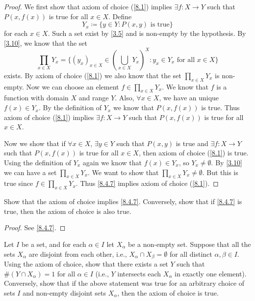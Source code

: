 \begin{proof}
  We first show that axiom of choice (\cref{8.1}) implies \(\exists f : X \to Y\) such that \(P(x, f(x))\) is true for all \(x \in X\).
  Define
  \[
    Y_x \coloneqq \{y \in Y : P(x, y) \text{ is true}\}
  \]
  for each \(x \in X\).
  Such a set exist by \cref{3.5} and is non-empty by the hypothesis.
  By \cref{3.10}, we know that the set
  \[
    \prod_{x \in X} Y_x = \Bigg\{(y_x)_{x \in X} \in (\bigcup_{x \in X} Y_x)^X : y_x \in Y_x \text{ for all } x \in X\Bigg\}
  \]
  exists.
  By axiom of choice (\cref{8.1}) we also know that the set \(\prod_{x \in X} Y_x\) is non-empty.
  Now we can choose an element \(f \in \prod_{x \in X} Y_x\).
  We know that \(f\) is a function with domain \(X\) and range \(Y\).
  Also, \(\forall x \in X\), we have an unique \(f(x) \in Y_x\).
  By the definition of \(Y_x\) we know that \(P(x, f(x))\) is true.
  Thus axiom of choice (\cref{8.1}) implies \(\exists f : X \to Y\) such that \(P(x, f(x))\) is true for all \(x \in X\).

  Now we show that if \(\forall x \in X\), \(\exists y \in Y\) such that \(P(x, y)\) is true and \(\exists f : X \to Y\) such that \(P(x, f(x))\) is true for all \(x \in X\), then axiom of choice (\cref{8.1}) is true.
  Using the definition of \(Y_x\) again we know that \(f(x) \in Y_x\), so \(Y_x \neq \emptyset\).
  By \cref{3.10} we can have a set \(\prod_{x \in X} Y_x\).
  We want to show that \(\prod_{x \in X} Y_x \neq \emptyset\).
  But this is true since \(f \in \prod_{x \in X} Y_x\).
  Thus \cref{8.4.7} implies axiom of choice (\cref{8.1}).
\end{proof}

\exercisesection

\begin{ex}\label{ex:8.4.1}
  Show that the axiom of choice implies \cref{8.4.7}.
  Conversely, show that if \cref{8.4.7} is true, then the axiom of choice is also true.
\end{ex}

\begin{proof}
  See \cref{8.4.7}.
\end{proof}

\begin{ex}\label{ex:8.4.2}
  Let \(I\) be a set, and for each \(\alpha \in I\) let \(X_{\alpha}\) be a non-empty set.
  Suppose that all the sets \(X_{\alpha}\) are disjoint from each other, i.e., \(X_{\alpha} \cap X_{\beta} = \emptyset\) for all distinct \(\alpha, \beta \in I\).
  Using the axiom of choice, show that there exists a set \(Y\) such that \(\#(Y \cap X_{\alpha}) = 1\) for all \(\alpha \in I\) (i.e., \(Y\) intersects each \(X_{\alpha}\) in exactly one element).
  Conversely, show that if the above statement was true for an arbitrary choice of sets \(I\) and non-empty disjoint sets \(X_{\alpha}\), then the axiom of choice is true.
\end{ex}

